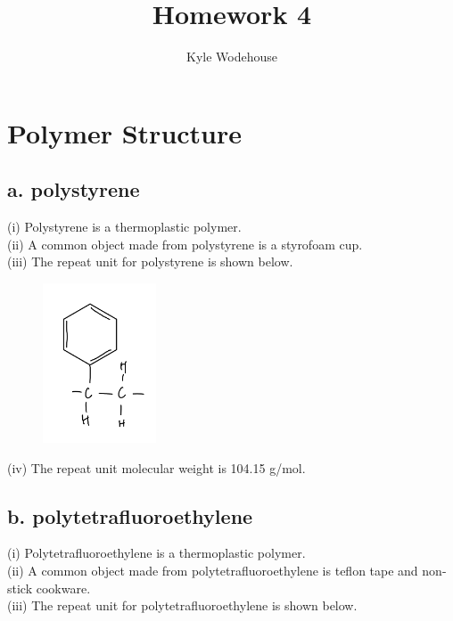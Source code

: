 \documentclass{article}
\title{\bfseries Homework 4}
\author{Kyle Wodehouse}
\begin{document}
\maketitle

\section{Polymer Structure}

\subsection*{a. polystyrene} 


(i) Polystyrene is a thermoplastic polymer. \\
(ii) A common object made from polystyrene is a styrofoam cup. \\
(iii) The repeat unit for polystyrene is shown below. 

\begin{figure}[H]
    \centering
    \includegraphics[width=0.3\textwidth]{polystyrene.jpeg}
\end{figure}

(iv) The repeat unit molecular weight is 104.15 g/mol.

\subsection*{b. polytetrafluoroethylene}

(i) Polytetrafluoroethylene is a thermoplastic polymer. \\
(ii) A common object made from polytetrafluoroethylene is teflon tape and non-stick cookware. \\
(iii) The repeat unit for polytetrafluoroethylene is shown below.
\end{document}
